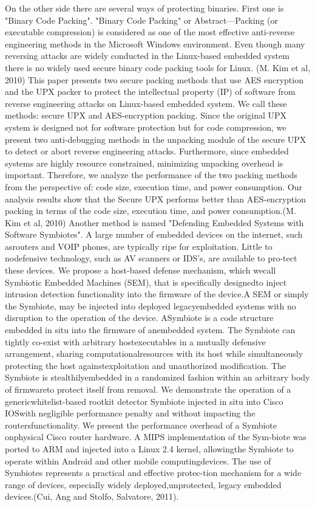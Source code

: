 \documentclass[]{report}
\begin{document}
\begin{center}
On the other side there are several ways of protecting binaries. First one is "Binary Code Packing".
"Binary Code Packing" or Abstract—Packing (or executable compression) is considered as
one of the most effective anti-reverse engineering methods in
the Microsoft Windows environment. Even though many
reversing attacks are widely conducted in the Linux-based
embedded system there is no widely used secure binary code
packing tools for Linux. (M. Kim et al, 2010)
This paper presents two secure
packing methods that use AES encryption and the UPX packer
to protect the intellectual property (IP) of software from
reverse engineering attacks on Linux-based embedded system.
We call these methods: secure UPX and AES-encryption
packing. Since the original UPX system is designed not for
software protection but for code compression, we present two
anti-debugging methods in the unpacking module of the secure
UPX to detect or abort reverse engineering attacks.
Furthermore, since embedded systems are highly resource
constrained, minimizing unpacking overhead is important.
Therefore, we analyze the performance of the two packing
methods from the perspective of: code size, execution
time, and power consumption. Our analysis results show
that the Secure UPX performs better than AES-encryption
packing in terms of the code size, execution time, and power
consumption.(M. Kim et al, 2010)
\newline						
Another method is named "Defending Embedded Systems with Software Symbiotes".
A large number of embedded devices on the internet, such asrouters and VOIP phones, are typically ripe for exploitation. Little to nodefensive technology, such as AV scanners or IDS’s, are available to pro-tect these devices. We propose a host-based defense mechanism, which wecall Symbiotic Embedded Machines (SEM), that is speciﬁcally designedto inject intrusion detection functionality into the ﬁrmware of the device.A SEM or simply the Symbiote, may be injected into deployed legacyembedded systems with no disruption to the operation of the device. ASymbiote is a code structure embedded in situ into the ﬁrmware of anembedded system. The Symbiote can tightly co-exist with arbitrary hostexecutables in a mutually defensive arrangement, sharing computationalresources with its host while simultaneously protecting the host againstexploitation and unauthorized modiﬁcation. The Symbiote is stealthilyembedded in a randomized fashion within an arbitrary body of ﬁrmwareto protect itself from removal. We demonstrate the operation of a genericwhitelist-based rootkit detector Symbiote injected in situ into Cisco IOSwith negligible performance penalty and without impacting the routersfunctionality. We present the performance overhead of a Symbiote onphysical Cisco router hardware. A MIPS implementation of the Sym-biote was ported to ARM and injected into a Linux 2.4 kernel, allowingthe Symbiote to operate within Android and other mobile computingdevices. The use of Symbiotes represents a practical and eﬀective protec-tion mechanism for a wide range of devices, especially widely deployed,unprotected, legacy embedded devices.(Cui, Ang and Stolfo, Salvatore, 2011).


\end{center}
\end{document}
